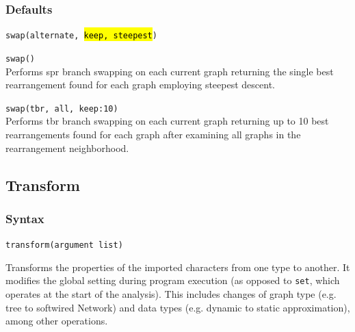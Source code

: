 		\subsubsection{Defaults}
			\texttt{swap(alternate, \hl{keep, steepest})}
		
		\begin{example}
			\item{\texttt{swap()}\\Performs spr branch swapping on each current graph returning the single 
			best rearrangement found for each graph employing steepest descent.}
			
			\item{\texttt{swap(tbr, all, keep:10)}\\Performs tbr branch swapping on each current graph 
			returning up to 10 best rearrangements found for each graph after examining all graphs in 
			the rearrangement neighborhood.}
		\end{example}
	
\subsection{Transform}
\label{subsec:transform}
	\subsubsection{Syntax}
		\texttt{transform(argument list)}
			
	\begin{phygdescription}
		{Transforms the properties of the imported characters from one type to another. It 
		modifies the global setting during program execution (as opposed to \texttt{set}, 
		which operates at the start of the analysis). This includes changes of graph type
		(e.g. tree to softwired Network) and data types (e.g. dynamic to static 
		approximation), among other operations.}
	\end{phygdescription}
			

